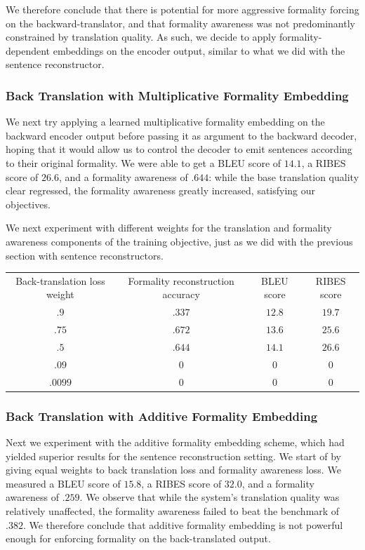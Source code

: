 \documentclass[11pt]{article}
\begin{document}
We therefore conclude that there is potential for more aggressive formality forcing on the backward-translator, and that formality awareness was not predominantly constrained by translation quality. As such, we decide to apply formality-dependent embeddings on the encoder output, similar to what we did with the sentence reconstructor.

\subsubsection{Back Translation with Multiplicative Formality Embedding}

We next try applying a learned multiplicative formality embedding on the backward encoder output before passing it as argument to the backward decoder, hoping that it would allow us to control the decoder to emit sentences according to their original formality. We were able to get a BLEU score of $14.1$, a RIBES score of $26.6$, and a formality awareness of $.644$: while the base translation quality clear regressed, the formality awareness greatly increased, satisfying our objectives.

We next experiment with different weights for the translation and formality awareness components of the training objective, just as we did with the previous section with sentence reconstructors.


\begin{tabular}{ c c c c }
    Back-translation loss weight & Formality reconstruction accuracy & BLEU score & RIBES score \\
    $.9$ & $.337$ & $12.8$ & $19.7$ \\
    $.75$ & $.672$ & $13.6$ & $25.6$ \\
    $.5$ & $.644$ & $14.1$ & $26.6$ \\
    $.09$ & $0$ & $0$ & $0$ \\
    $.0099$ & $0$ & $0$ & $0$ \\
\end{tabular}

\subsubsection{Back Translation with Additive Formality Embedding}

Next we experiment with the additive formality embedding scheme, which had yielded superior results for the sentence reconstruction setting. We start of by giving equal weights to back translation loss and formality awareness loss. We measured a BLEU score of $15.8$, a RIBES score of $32.0$, and a formality awareness of $.259$. We observe that while the system's translation quality was relatively unaffected, the formality awareness failed to beat the benchmark of $.382$. We therefore conclude that additive formality embedding is not powerful enough for enforcing formality on the back-translated output.
\end{document}
